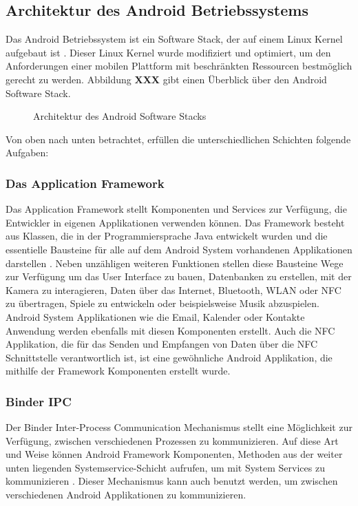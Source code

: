 \subsection{Architektur des Android Betriebssystems}

Das Android Betriebssystem ist ein Software Stack, der auf einem Linux Kernel aufgebaut ist \cite{android-platform-architecture}. Dieser Linux Kernel wurde modifiziert und optimiert, um den Anforderungen einer mobilen Plattform mit beschränkten Ressourcen bestmöglich gerecht zu werden. Abbildung \textbf{XXX} gibt einen Überblick über den Android Software Stack. 

\begin{figure}[h]
	\caption{Architektur des Android Software Stacks}
\end{figure}

Von oben nach unten betrachtet, erfüllen die unterschiedlichen Schichten folgende Aufgaben:

\subsubsection{Das Application Framework}

Das Application Framework stellt Komponenten und Services zur Verfügung, die Entwickler in eigenen Applikationen verwenden können. Das Framework besteht aus Klassen, die in der Programmiersprache Java entwickelt wurden und die essentielle Bausteine für alle auf dem Android System vorhandenen Applikationen darstellen \cite{android-platform-architecture}. Neben unzähligen weiteren Funktionen stellen diese Bausteine Wege zur Verfügung um das User Interface zu bauen, Datenbanken zu erstellen, mit der Kamera zu interagieren, Daten über das Internet, Bluetooth, WLAN oder NFC zu übertragen, Spiele zu entwickeln oder beispielsweise Musik abzuspielen. Android System Applikationen wie die Email, Kalender oder Kontakte Anwendung werden ebenfalls mit diesen Komponenten erstellt. Auch die NFC Applikation, die für das Senden und Empfangen von Daten über die NFC Schnittstelle verantwortlich ist, ist eine gewöhnliche Android Applikation, die mithilfe der Framework Komponenten erstellt wurde. 

\subsubsection{Binder IPC}

Der Binder Inter-Process Communication Mechanismus stellt eine Möglichkeit zur Verfügung, zwischen verschiedenen Prozessen zu kommunizieren. Auf diese Art und Weise können Android Framework Komponenten, Methoden aus der weiter unten liegenden Systemservice-Schicht aufrufen, um mit System Services zu kommunizieren \cite{android-architecture}. Dieser Mechanismus kann auch benutzt werden, um zwischen verschiedenen Android Applikationen zu kommunizieren. 

